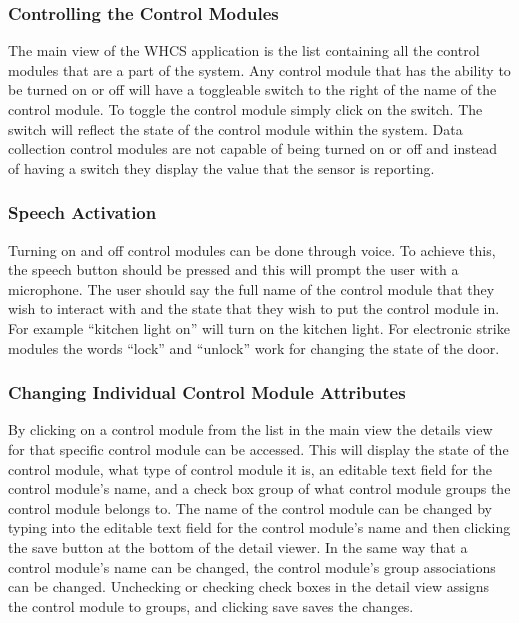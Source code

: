 \subsubsection{Controlling the Control Modules}

The main view of the WHCS application is the list containing all the control modules that are a part of the system. Any control module that has the ability to be turned on or off will have a toggleable switch to the right of the name of the control module. To toggle the control module simply click on the switch. The switch will reflect the state of the control module within the system. Data collection control modules are not capable of being turned on or off and instead of having a switch they display the value that the sensor is reporting.

\subsubsection{Speech Activation}

Turning on and off control modules can be done through voice. To achieve this, the speech button should be pressed and this will prompt the user with a microphone. The user should say the full name of the control module that they wish to interact with and the state that they wish to put the control module in. For example “kitchen light on” will turn on the kitchen light. For electronic strike modules the words “lock” and “unlock” work for changing the state of the door.

\subsubsection{Changing Individual Control Module Attributes}

By clicking on a control module from the list in the main view the details view
for that specific control module can be accessed. This will display the state
of the control module, what type of control module it is, an editable text
field for the control module’s name, and a check box group of what control
module groups the control module belongs to. The name of the control module can
be changed by typing into the editable text field for the control module’s name
and then clicking the save button at the bottom of the detail viewer. In the
same way that a control module’s name can be changed, the control module’s
group associations can be changed. Unchecking or checking check boxes in the
detail view assigns the control module to groups, and clicking save saves the
changes.


